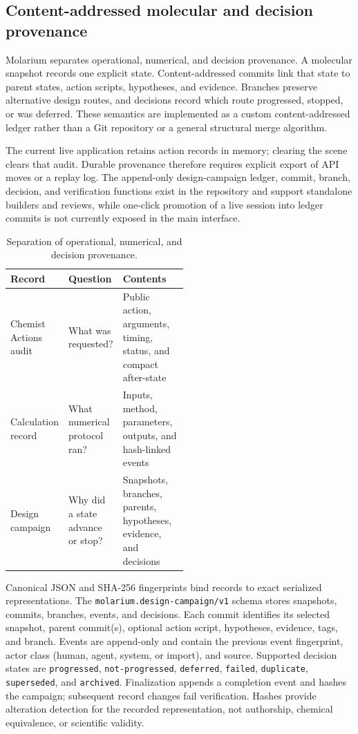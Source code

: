 \documentclass[11pt]{article}
\begin{document}
\begin{small}
\subsection{Content-addressed molecular and decision provenance}

Molarium separates operational, numerical, and decision provenance. A molecular snapshot records one explicit state. Content-addressed commits link that state to parent states, action scripts, hypotheses, and evidence. Branches preserve alternative design routes, and decisions record which route progressed, stopped, or was deferred. These semantics are implemented as a custom content-addressed ledger rather than a Git repository or a general structural merge algorithm.

The current live application retains action records in memory; clearing the scene clears that audit. Durable provenance therefore requires explicit export of API moves or a replay log. The append-only design-campaign ledger, commit, branch, decision, and verification functions exist in the repository and support standalone builders and reviews, while one-click promotion of a live session into ledger commits is not currently exposed in the main interface.

\begin{table}[htbp]
\centering\small
\caption{Separation of operational, numerical, and decision provenance.}
\label{tab:appA_provenance}
\begin{tabularx}{\linewidth}{@{}p{0.24\linewidth}p{0.27\linewidth}X@{}}
\toprule
\textbf{Record} & \textbf{Question} & \textbf{Contents}\\
\midrule
Chemist Actions audit & What was requested? & Public action, arguments, timing, status, and compact after-state\\
Calculation record & What numerical protocol ran? & Inputs, method, parameters, outputs, and hash-linked events\\
Design campaign & Why did a state advance or stop? & Snapshots, branches, parents, hypotheses, evidence, and decisions\\
\bottomrule
\end{tabularx}
\end{table}

Canonical JSON and SHA-256 fingerprints bind records to exact serialized representations. The \texttt{molarium.design-campaign/v1} schema stores snapshots, commits, branches, events, and decisions. Each commit identifies its selected snapshot, parent commit(s), optional action script, hypotheses, evidence, tags, and branch. Events are append-only and contain the previous event fingerprint, actor class (human, agent, system, or import), and source. Supported decision states are \texttt{progressed}, \texttt{not-progressed}, \texttt{deferred}, \texttt{failed}, \texttt{duplicate}, \texttt{superseded}, and \texttt{archived}. Finalization appends a completion event and hashes the campaign; subsequent record changes fail verification. Hashes provide alteration detection for the recorded representation, not authorship, chemical equivalence, or scientific validity.


\end{small}
\end{document}
